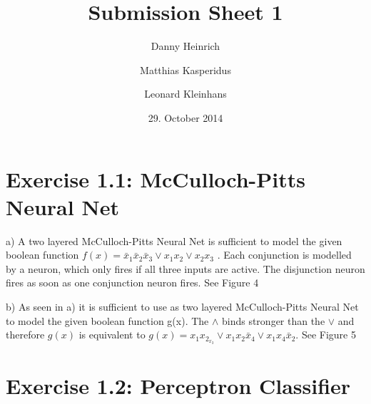 \documentclass{scrartcl}
\title{Submission Sheet 1}
\author{Danny Heinrich \and Matthias Kasperidus \and Leonard Kleinhans}
\date{29. October 2014}
\begin{document}
\maketitle

\section{Exercise 1.1: McCulloch-Pitts Neural Net}
\item a) A two layered McCulloch-Pitts Neural Net is sufficient to model the given boolean function $f(x) = \bar x_1 \bar x_2 \bar x_3 \vee  x_1 x_2 \vee x_2 x_3 $ . Each conjunction is modelled by a neuron, which only fires if all three
inputs are active. The disjunction neuron fires as soon as one conjunction neuron fires. See Figure 4

\item b) As seen in a) it is sufficient to use as two layered McCulloch-Pitts Neural Net to model the given boolean function g(x). 
The $\wedge$ binds stronger than the $\vee$ and therefore $g(x)$ is equivalent to $g(x) = x_1 x_2_x_3 \vee  x_1 x_2 \bar x_4\vee x_1 x_4 \bar x_2 $. See Figure 5

\section{Exercise 1.2: Perceptron Classifier}
\end{document}

